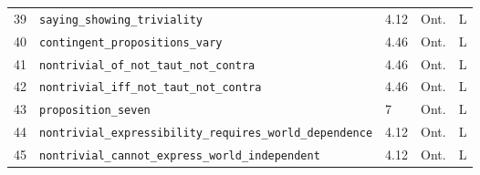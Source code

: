 \documentclass[jsl,bibother]{asl}
\theoremstyle{definition}
\theoremstyle{remark}
\begin{document}
\begin{table}[p]
\begin{tabular}{@{}rlllc@{}}
39 & \texttt{saying\_showing\_triviality}                & 4.12    & Ont. & L \\
40 & \texttt{contingent\_propositions\_vary}             & 4.46    & Ont. & L \\
41 & \texttt{nontrivial\_of\_not\_taut\_not\_contra}     & 4.46    & Ont. & L \\
42 & \texttt{nontrivial\_iff\_not\_taut\_not\_contra}    & 4.46    & Ont. & L \\
43 & \texttt{proposition\_seven}                         & 7       & Ont. & L \\
44 & \texttt{nontrivial\_expressibility\_requires\_world\_dependence}
                                                         & 4.12    & Ont. & L \\
45 & \texttt{nontrivial\_cannot\_express\_world\_independent}
                                                         & 4.12    & Ont. & L \\
\bottomrule
\end{tabular}
\end{table}
\end{document}
